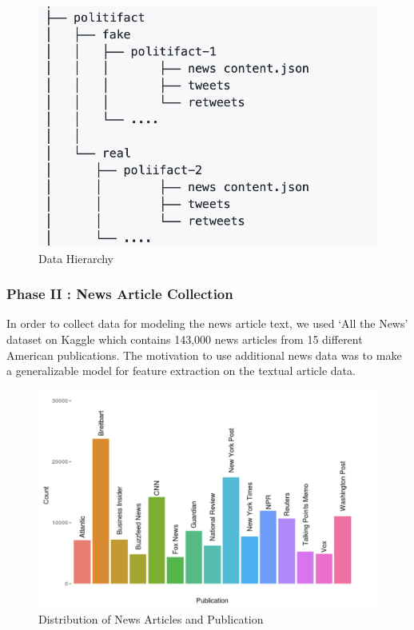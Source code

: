 \documentclass{article}
\begin{document}
\begin{figure}
    \centering
    \includegraphics[scale=0.6]{NeuRIPS2019/fakenews.png}
    \caption{Data Hierarchy}
    \label{DataHierarchy}
\end{figure}
\subsubsection{Phase II : News Article Collection}
In order to collect data for modeling the news article text, we used ‘All the News’ dataset on Kaggle \cite{allnewsdata} which contains 143,000 news articles from 15 different American publications. 
The motivation to use additional news data was to make a generalizable model for feature extraction on the textual article data.

\begin{figure}
    \centering
    \includegraphics[scale=0.5]{NeuRIPS2019/all-the-news.png}
    \caption{Distribution of News Articles and Publication}
    \label{NewsDistribution}
\end{figure}
\end{document}
